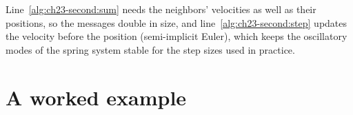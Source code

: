 \begin{algorithm}[htb]
\caption{One control period of the second-order formation controller on drone $i$}
\label{alg:ch23-second}
\end{algorithm}

Line~\ref{alg:ch23-second:sum} needs the neighbors' velocities as well as
their positions, so the messages double in size, and
line~\ref{alg:ch23-second:step} updates the velocity before the position
(semi-implicit Euler), which keeps the oscillatory modes of the spring system
stable for the step sizes used in practice.

\section{A worked example}
\label{sec:ch23-example}


